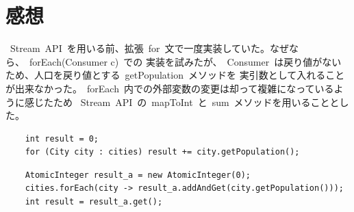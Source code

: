 \documentclass[10pt]{jarticle}
\begin{document}
\section{感想}
\ Stream\ API\ を用いる前、拡張\ for\ 文で一度実装していた。なぜなら、\ forEach(Consumer c)\ での
実装を試みたが、\ Consumer\ は戻り値がないため、人口を戻り値とする\ getPopulation\ メソッドを
実引数として入れることが出来なかった。\ forEach\ 内での外部変数の変更は却って複雑になっているように感じたため
\ Stream\ API\ の\ mapToInt\ と\ sum\ メソッドを用いることとした。
\begin{lstlisting}
	int result = 0;
	for (City city : cities) result += city.getPopulation();
\end{lstlisting}
\begin{lstlisting}
	AtomicInteger result_a = new AtomicInteger(0);
	cities.forEach(city -> result_a.addAndGet(city.getPopulation()));
	int result = result_a.get();
\end{lstlisting}
\end{document}
